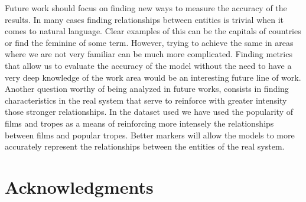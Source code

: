 \documentclass[letterpaper]{article}
\begin{document}
	Future work should focus on finding new ways to measure the accuracy of the results. In many cases finding relationships between entities is trivial when it comes to natural language. Clear examples of this can be the capitals of countries or find the feminine of some term. However, trying to achieve the same in areas where we are not very familiar can be much more complicated. Finding metrics that allow us to evaluate the accuracy of the model without the need to have a very deep knowledge of the work area would be an interesting future line of work. Another question worthy of being analyzed in future works, consists in finding characteristics in the real system that serve to reinforce with greater intensity those stronger relationships. In the dataset used we have used the popularity of films and tropes as a means of reinforcing more intensely the relationships between films and popular tropes. Better markers will allow the models to more accurately represent the relationships between the entities of the real system.
	
	
	
	\section{Acknowledgments}
	
	
	
	
\end{document}

